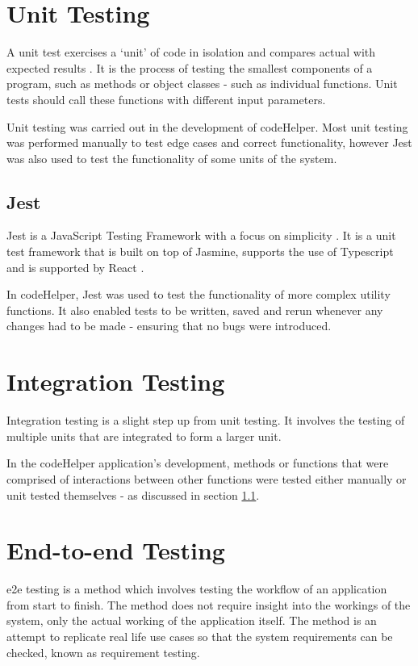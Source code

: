 \section{Unit Testing}

A unit test exercises a `unit' of code in isolation and compares actual with expected results \cite{olan}. It is the process of testing the smallest components of a program, such as methods or object classes \cite{sommerville} - such as individual functions. Unit tests should call these functions with different input parameters. 

Unit testing was carried out in the development of codeHelper. Most unit testing was performed manually to test edge cases and correct functionality, however Jest \cite{jest} was also used to test the functionality of some units of the system.

\subsection{Jest}\label{sec:jest}

Jest is a JavaScript Testing Framework with a focus on simplicity \cite{jest}. It is a unit test framework that is built on top of Jasmine, supports the use of Typescript and is supported by React \cite{paul}.

In codeHelper, Jest was used to test the functionality of more complex utility functions. It also enabled tests to be written, saved and rerun whenever any changes had to be made - ensuring that no bugs were introduced. 
 
\section{Integration Testing}

Integration testing is a slight step up from unit testing. It involves the testing of multiple units that are integrated to form a larger unit. 

In the codeHelper application's development, methods or functions that were comprised of interactions between other functions were tested either manually or unit tested themselves - as discussed in section \ref{sec:jest}. 

\section{End-to-end Testing}

\gls{e2e} testing is a method which involves testing the workflow of an application from start to finish. The method does not require insight into the workings of the system, only the actual working of the application itself. The method is an attempt to replicate real life use cases so that the system requirements can be checked, known as requirement testing.

